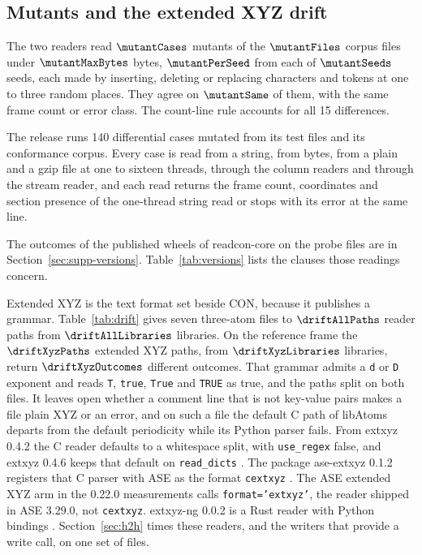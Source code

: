 \subsection{Mutants and the extended XYZ drift}
The two readers read \(\mutantCases\) mutants of the \(\mutantFiles\) corpus files under \(\mutantMaxBytes\) bytes, \(\mutantPerSeed\) from each of \(\mutantSeeds\) seeds, each made by inserting, deleting or replacing characters and tokens at one to three random places.
They agree on \(\mutantSame\) of them, with the same frame count or error class.
The count-line rule accounts for all 15 differences.

The release runs 140 differential cases mutated from its test files and its conformance corpus.
Every case is read from a string, from bytes, from a plain and a gzip file at one to sixteen threads, through the column readers and through the stream reader, and each read returns the frame count, coordinates and section presence of the one-thread string read or stops with its error at the same line.

The outcomes of the published wheels of readcon-core \driftWheels{} on the probe files are in Section~\ref{sec:supp-versions}.
Table~\ref{tab:versions} lists the clauses those readings concern.

Extended XYZ is the text format set beside CON, because it publishes a grammar.
Table~\ref{tab:drift} gives seven three-atom files to \(\driftAllPaths\) reader paths from \(\driftAllLibraries\) libraries.
On the reference frame the \(\driftXyzPaths\) extended XYZ paths, from \(\driftXyzLibraries\) libraries, return \(\driftXyzOutcomes\) different outcomes.
That grammar admits a \texttt{d} or \texttt{D} exponent and reads \texttt{T}, \texttt{true}, \texttt{True} and \texttt{TRUE} as true, and the paths split on both files.
It leaves open whether a comment line that is not key-value pairs makes a file plain XYZ or an error, and on such a file the default C path of libAtoms departs from the default periodicity while its Python parser fails.
From extxyz 0.4.2 the C reader defaults to a whitespace split, with \texttt{use\_regex} false, and extxyz 0.4.6 keeps that default on \texttt{read\_dicts} \cite{kermodeExtxyz0422026}.
The package ase-extxyz 0.1.2 registers that C parser with ASE as the format \texttt{cextxyz} \cite{kermodeAseExtxyz0122026}.
The ASE extended XYZ arm in the 0.22.0 measurements calls \texttt{format='extxyz'}, the reader shipped in ASE 3.29.0, not \texttt{cextxyz}.
extxyz-ng 0.0.2 is a Rust reader with Python bindings \cite{yuExtxyzNg0022026}.
Section~\ref{sec:h2h} times these readers, and the writers that provide a write call, on one set of files.

